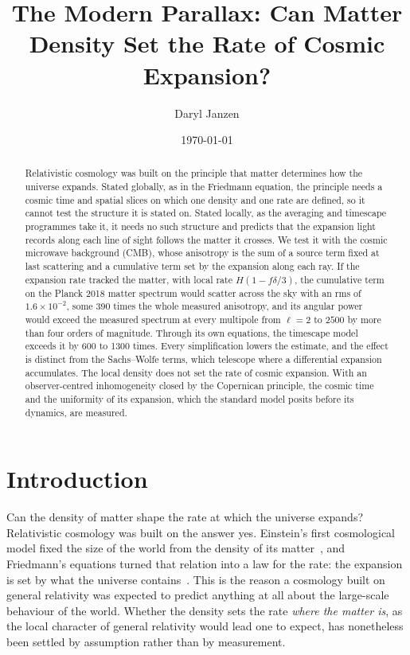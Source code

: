 \documentclass[aps,prd,reprint,amsmath,amssymb,superscriptaddress]{revtex4-2}
\begin{document}
\title{The Modern Parallax: Can Matter Density Set the Rate of Cosmic Expansion?}

\author{Daryl Janzen}

\date{\today}

\begin{abstract}
Relativistic cosmology was built on the principle that matter determines how the universe expands. Stated globally, as in the Friedmann equation, the principle needs a cosmic time and spatial slices on which one density and one rate are defined, so it cannot test the structure it is stated on. Stated locally, as the averaging and timescape programmes take it, it needs no such structure and predicts that the expansion light records along each line of sight follows the matter it crosses. We test it with the cosmic microwave background (CMB), whose anisotropy is the sum of a source term fixed at last scattering and a cumulative term set by the expansion along each ray. If the expansion rate tracked the matter, with local rate $H(1-f\delta/3)$, the cumulative term on the Planck 2018 matter spectrum would scatter across the sky with an rms of $1.6\times10^{-2}$, some 390 times the whole measured anisotropy, and its angular power would exceed the measured spectrum at every multipole from $\ell=2$ to $2500$ by more than four orders of magnitude. Through its own equations, the timescape model exceeds it by 600 to 1300 times. Every simplification lowers the estimate, and the effect is distinct from the Sachs--Wolfe terms, which telescope where a differential expansion accumulates. The local density does not set the rate of cosmic expansion. With an observer-centred inhomogeneity closed by the Copernican principle, the cosmic time and the uniformity of its expansion, which the standard model posits before its dynamics, are measured.
\end{abstract}

\maketitle

\section{Introduction}\label{sec:intro}

Can the density of matter shape the rate at which the universe expands? Relativistic cosmology was built on the answer yes. Einstein's first cosmological model fixed the size of the world from the density of its matter~\cite{Einstein1917}, and Friedmann's equations turned that relation into a law for the rate: the expansion is set by what the universe contains~\cite{Friedmann1922, Friedmann1924}. This is the reason a cosmology built on general relativity was expected to predict anything at all about the large-scale behaviour of the world. Whether the density sets the rate \emph{where the matter is}, as the local character of general relativity would lead one to expect, has nonetheless been settled by assumption rather than by measurement.
\end{document}
